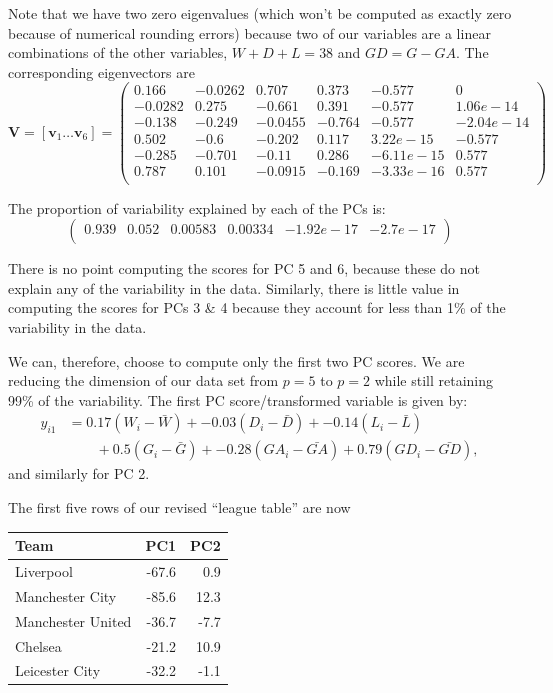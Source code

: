 \documentclass[]{book}
\theoremstyle{definition}
\theoremstyle{definition}
\theoremstyle{definition}
\theoremstyle{remark}
\begin{document}
Note that we have two zero eigenvalues (which won't be computed as exactly zero because of numerical rounding errors) because two of our variables are a linear combinations of the other variables, \(W+D+L = 38\) and \(GD=G-GA\). The corresponding eigenvectors are
\[\mathbf V= [\mathbf v_1 \ldots \mathbf v_6] =\begin{pmatrix}0.166&-0.0262&0.707&0.373&-0.577&0 \\-0.0282&0.275&-0.661&0.391&-0.577&1.06e-14 \\-0.138&-0.249&-0.0455&-0.764&-0.577&-2.04e-14 \\0.502&-0.6&-0.202&0.117&3.22e-15&-0.577 \\-0.285&-0.701&-0.11&0.286&-6.11e-15&0.577 \\0.787&0.101&-0.0915&-0.169&-3.33e-16&0.577 \\\end{pmatrix}\]

The proportion of variability explained by each of the PCs is:
\[
\begin{pmatrix}0.939&0.052&0.00583&0.00334&-1.92e-17&-2.7e-17 \\\end{pmatrix}
\]

There is no point computing the scores for PC 5 and 6, because these do not explain any of the variability in the data. Similarly, there is little value in computing the scores for PCs 3 \& 4 because they account for less than 1\% of the variability in the data.

We can, therefore, choose to compute only the first two PC scores. We are reducing the dimension of our data set from \(p=5\) to \(p=2\) while still retaining 99\% of the variability. The first PC score/transformed variable is given by:
\begin{align*}
y_{i1} &= 0.17(W_i-\bar{W}) +-0.03(D_i-\bar{D}) +-0.14(L_i-\bar{L})\\
& \qquad +0.5(G_i-\bar{G}) +-0.28(GA_i-\bar{GA})+0.79(GD_i-\bar{GD}),
\end{align*}
and similarly for PC 2.

The first five rows of our revised ``league table'' are now

\begin{table}[H]
\centering
\begin{tabular}{lrr}
\toprule
Team & PC1 & PC2\\
\midrule
Liverpool & -67.6 & 0.9\\
Manchester City & -85.6 & 12.3\\
Manchester United & -36.7 & -7.7\\
Chelsea & -21.2 & 10.9\\
Leicester City & -32.2 & -1.1\\
\bottomrule
\end{tabular}
\end{table}
\end{document}
